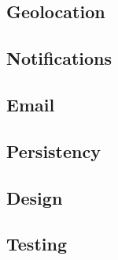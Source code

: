 \subsection{Geolocation}

\subsection{Notifications}

\subsection{Email}

\subsection{Persistency}

\subsection{Design}

\subsection{Testing}

